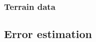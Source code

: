 \begin{comment}
How to set up the cross-validation for Ridge and/or Lasso

* Define a range of interest for the penalty parameter.

* Divide the data set into training and test set comprising samples $\{1, \ldots, n\} \setminus i$ and $\{ i \}$, respectively.

* Fit the linear regression model by means of ridge estimation  for each $\lambda$ in the grid using the training set, and the corresponding estimate of the error variance $\boldsymbol{\sigma}_{-i}^2(\lambda)$, as

\begin{align*}
\boldsymbol{\beta}_{-i}(\lambda) & =  ( \boldsymbol{X}_{-i, \ast}^{T}
\boldsymbol{X}_{-i, \ast} + \lambda \boldsymbol{I}_{pp})^{-1}
\boldsymbol{X}_{-i, \ast}^{T} \boldsymbol{y}_{-i}
\end{align*}

* Evaluate the prediction performance of these models on the test set by $[y_i, \boldsymbol{X}_{i, \ast}; \boldsymbol{\beta}_{-i}(\lambda), \boldsymbol{\sigma}_{-i}^2(\lambda)]$. Or, by the prediction error $|y_i - \boldsymbol{X}_{i, \ast} \boldsymbol{\beta}_{-i}(\lambda)|$, the relative error, the error squared or the R2 score function.

* Repeat the first three steps  such that each sample plays the role of the test set once.

* Average the prediction performances of the test sets at each grid point of the penalty bias/parameter. It is an estimate of the prediction performance of the model corresponding to this value of the penalty parameter on novel data. It is defined as

\begin{align*}
\frac{1}{n} \sum_{i = 1}^n \log\{L[y_i, \mathbf{X}_{i, \ast}; \boldsymbol{\beta}_{-i}(\lambda), \boldsymbol{\sigma}_{-i}^2(\lambda)]\}.
\end{align*}
\end{comment}


\subsubsection{Terrain data}

\subsection{Error estimation}

